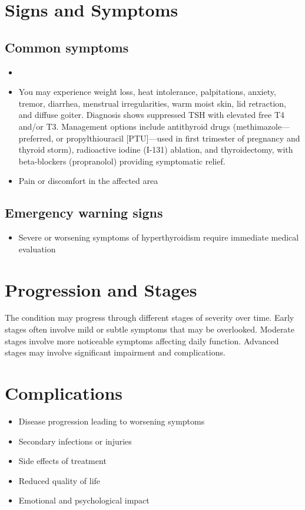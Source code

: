 \section{Signs and Symptoms}
\subsection{Common symptoms}
\begin{itemize}[noitemsep]
  \item \item You may experience weight loss, heat intolerance, palpitations, anxiety, tremor, diarrhea, menstrual irregularities, warm moist skin, lid retraction, and diffuse goiter. Diagnosis shows suppressed TSH with elevated free T4 and/or T3. Management options include antithyroid drugs (methimazole---preferred, or propylthiouracil [PTU]---used in first trimester of pregnancy and thyroid storm), radioactive iodine (I-131) ablation, and thyroidectomy, with beta-blockers (propranolol) providing symptomatic relief.
  \item Pain or discomfort in the affected area
  \end{itemize}
\subsection{Emergency warning signs}
\begin{itemize}[noitemsep]
  \item Severe or worsening symptoms of hyperthyroidism require immediate medical evaluation
\end{itemize}
\section{Progression and Stages}
The condition may progress through different stages of severity over time. Early stages often involve mild or subtle symptoms that may be overlooked. Moderate stages involve more noticeable symptoms affecting daily function. Advanced stages may involve significant impairment and complications.
\section{Complications}
\begin{itemize}[noitemsep]
  \item Disease progression leading to worsening symptoms
  \item Secondary infections or injuries
  \item Side effects of treatment
  \item Reduced quality of life
  \item Emotional and psychological impact
\end{itemize}
